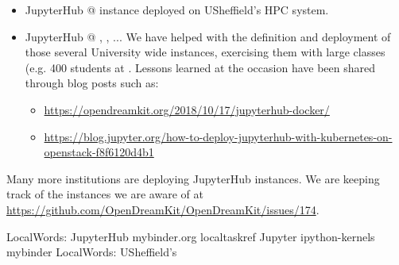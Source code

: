 \begin{itemize}
\item{JupyterHub @ }
  \href{http://docs.iceberg.shef.ac.uk/en/latest/using-iceberg/accessing/jupyterhub.html}{\JupyterHub}
  instance deployed on USheffield's HPC system.

\item{JupyterHub @ , , ...} We have helped with
  the definition and deployment of those several University wide
  instances, exercising them with large classes (e.g. 400 students at
  . Lessons learned at the occasion have been shared
  through blog posts such as:
  \begin{itemize}
  \item \url{https://opendreamkit.org/2018/10/17/jupyterhub-docker/}
  \item \url{https://blog.jupyter.org/how-to-deploy-jupyterhub-with-kubernetes-on-openstack-f8f6120d4b1}
  \end{itemize}
\end{itemize}

Many more institutions are deploying JupyterHub instances. We are
keeping track of the instances we are aware of at
\url{https://github.com/OpenDreamKit/OpenDreamKit/issues/174}.



LocalWords:  JupyterHub mybinder.org localtaskref Jupyter ipython-kernels mybinder
LocalWords:  USheffield's
